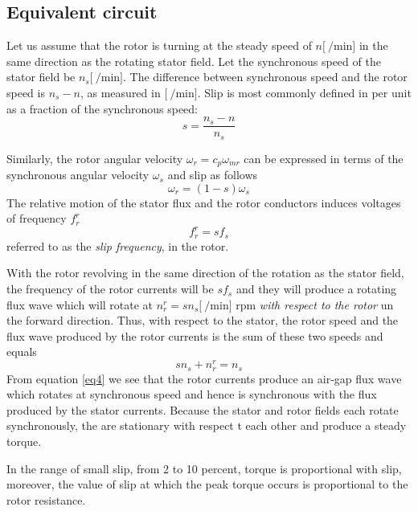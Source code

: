 \documentclass[12pt,a4paper,oneside]{book}
\begin{document}
\begin{onehalfspace}
\section{Equivalent circuit}
Let us assume that the rotor is turning at the steady speed of $n\Big[\SI{}{\per\minute}\Big]$ in the same direction as the rotating stator field. Let the synchronous speed of the stator field be $n_s\Big[\SI{}{\per\minute}\Big]$. The difference between synchronous speed and the rotor speed is $n_s-n$, as measured in $\Big[\SI{}{\per\minute}\Big]$. Slip is most commonly defined in per unit as a fraction of the synchronous speed:
\begin{equation} \label{eq1}
	s=\frac{n_s - n}{n_s}
\end{equation}

Similarly, the rotor angular velocity $\omega_r=c_p\omega_{mr}$ can be expressed in terms of the synchronous angular velocity $\omega_s$ and slip as follows
\begin{equation} \label{eq2}
	\omega_r=(1-s)\omega_s
\end{equation}
The relative motion of the stator flux and the rotor conductors induces voltages of frequency $f_r^r$
\begin{equation} \label{eq3}
	f_r^r=sf_s
\end{equation}
referred to as the \textit{slip frequency}, in the rotor.

With the rotor revolving in the same direction of the rotation as the stator field, the frequency of the rotor currents will be $sf_s$ and they will produce a rotating flux wave which will rotate at $n_r^r=sn_s\Big[\SI{}{\per\minute}\Big]$ rpm \textit{with respect to the rotor} un the forward direction. Thus, with respect to the stator, the rotor speed and the flux wave produced by the rotor currents is the sum of these two speeds and equals
\begin{equation} \label{eq4}
	s n_s + n_r^r = n_s
\end{equation}
From equation \ref{eq4} we see that the rotor currents produce an air-gap flux wave which rotates at synchronous speed and hence is synchronous with the flux produced by the stator currents. Because the stator and rotor fields each rotate synchronously, the are stationary with respect t each other and produce a steady torque.

In the range of small slip, from 2 to 10 percent, torque is proportional with slip, moreover, the value of slip at which the peak torque occurs is proportional to the rotor resistance.


\end{onehalfspace}
\end{document}
